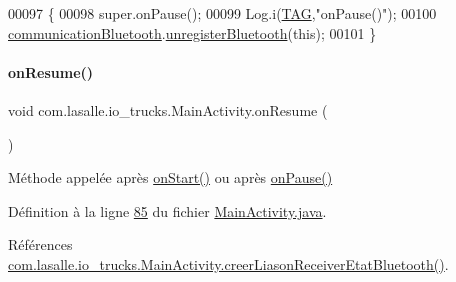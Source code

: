 \begin{DoxyCode}
00097     \{
00098         super.onPause();
00099         Log.i(\hyperlink{classcom_1_1lasalle_1_1io__trucks_1_1_main_activity_a37b90dba972711328e3f4c83c55eb0fc}{TAG},\textcolor{stringliteral}{"onPause()"});
00100         \hyperlink{classcom_1_1lasalle_1_1io__trucks_1_1_main_activity_aef1818afc9c0d071330ccc244e4b3794}{communicationBluetooth}.\hyperlink{classcom_1_1lasalle_1_1io__trucks_1_1_communication_ad5df5cc22c05d1a2af2b2c0adde57dea}{unregisterBluetooth}(\textcolor{keyword}{this});
00101     \}
\end{DoxyCode}
\mbox{\label{classcom_1_1lasalle_1_1io__trucks_1_1_main_activity_adc08807b3af20598d330f394acf55ecb}} 
\paragraph{\texorpdfstring{on\+Resume()}{onResume()}}
{\footnotesize\ttfamily void com.\+lasalle.\+io\+\_\+trucks.\+Main\+Activity.\+on\+Resume (\begin{DoxyParamCaption}{ }\end{DoxyParamCaption})\hspace{0.3cm}{\ttfamily [protected]}}



Méthode appelée après \hyperlink{classcom_1_1lasalle_1_1io__trucks_1_1_main_activity_a88715b4d1f7b33b3871849de4c667abf}{on\+Start()} ou après \hyperlink{classcom_1_1lasalle_1_1io__trucks_1_1_main_activity_a3d9481fd69693e777afbbfba5ddb0132}{on\+Pause()} 



Définition à la ligne \hyperlink{_main_activity_8java_source_l00085}{85} du fichier \hyperlink{_main_activity_8java_source}{Main\+Activity.\+java}.



Références \hyperlink{_main_activity_8java_source_l00287}{com.\+lasalle.\+io\+\_\+trucks.\+Main\+Activity.\+creer\+Liason\+Receiver\+Etat\+Bluetooth()}.


